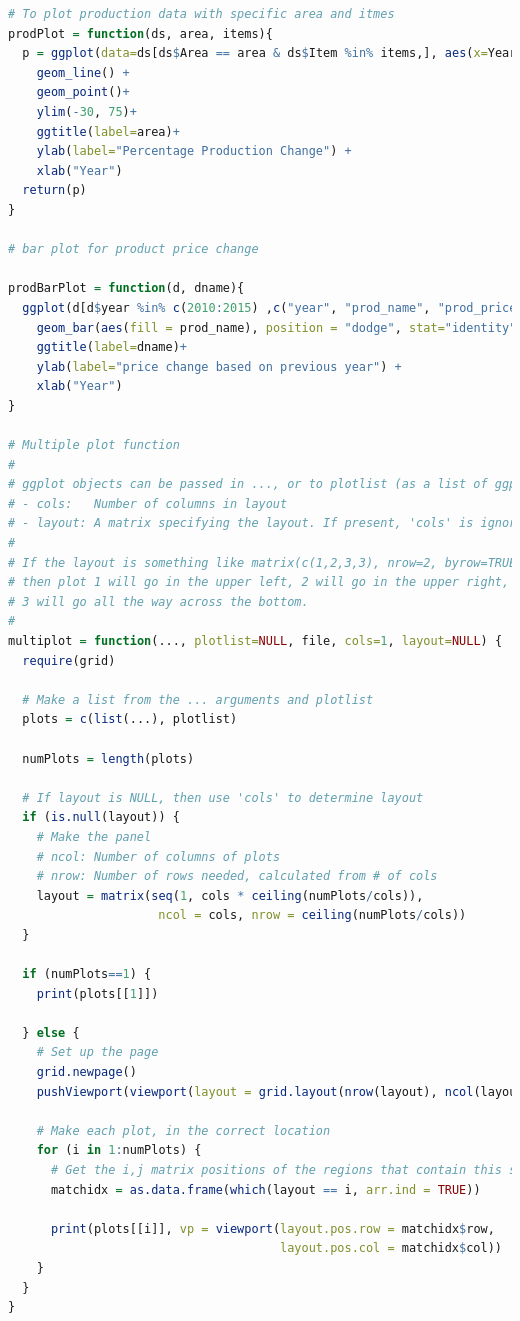 \documentclass[11pt]{article}
\begin{document}
\begin{lstlisting}[language= R]
# To plot production data with specific area and itmes
prodPlot = function(ds, area, items){
  p = ggplot(data=ds[ds$Area == area & ds$Item %in% items,], aes(x=Year, y=Percentage, colour=Item)) +
    geom_line() +
    geom_point()+
    ylim(-30, 75)+
    ggtitle(label=area)+
    ylab(label="Percentage Production Change") +
    xlab("Year")
  return(p)
}

# bar plot for product price change 

prodBarPlot = function(d, dname){
  ggplot(d[d$year %in% c(2010:2015) ,c("year", "prod_name", "prod_price_Percent")], aes(x = year, y = prod_price_Percent)) +
    geom_bar(aes(fill = prod_name), position = "dodge", stat="identity") +
    ggtitle(label=dname)+
    ylab(label="price change based on previous year") +
    xlab("Year")
}

# Multiple plot function
#
# ggplot objects can be passed in ..., or to plotlist (as a list of ggplot objects)
# - cols:   Number of columns in layout
# - layout: A matrix specifying the layout. If present, 'cols' is ignored.
#
# If the layout is something like matrix(c(1,2,3,3), nrow=2, byrow=TRUE),
# then plot 1 will go in the upper left, 2 will go in the upper right, and
# 3 will go all the way across the bottom.
#
multiplot = function(..., plotlist=NULL, file, cols=1, layout=NULL) {
  require(grid)
  
  # Make a list from the ... arguments and plotlist
  plots = c(list(...), plotlist)
  
  numPlots = length(plots)
  
  # If layout is NULL, then use 'cols' to determine layout
  if (is.null(layout)) {
    # Make the panel
    # ncol: Number of columns of plots
    # nrow: Number of rows needed, calculated from # of cols
    layout = matrix(seq(1, cols * ceiling(numPlots/cols)),
                     ncol = cols, nrow = ceiling(numPlots/cols))
  }
  
  if (numPlots==1) {
    print(plots[[1]])
    
  } else {
    # Set up the page
    grid.newpage()
    pushViewport(viewport(layout = grid.layout(nrow(layout), ncol(layout))))
    
    # Make each plot, in the correct location
    for (i in 1:numPlots) {
      # Get the i,j matrix positions of the regions that contain this subplot
      matchidx = as.data.frame(which(layout == i, arr.ind = TRUE))
      
      print(plots[[i]], vp = viewport(layout.pos.row = matchidx$row,
                                      layout.pos.col = matchidx$col))
    }
  }
}



\end{lstlisting}
\end{document}
